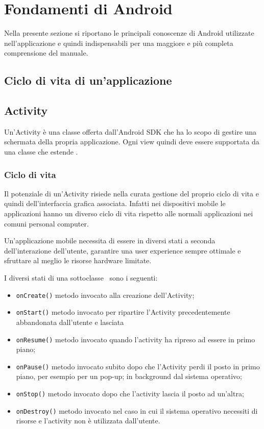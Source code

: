 \documentclass[../ManualeSviluppatore.tex]{subfiles}
\begin{document}
\begin{appendices}
	\label{sec:FondamentiDiAndroid}
	\section{Fondamenti di Android}
		Nella presente sezione si riportano le principali conoscenze di Android utilizzate nell'applicazione e quindi indispensabili per una maggiore e più completa comprensione del manuale.
	
		\subsection{Ciclo di vita di un'applicazione}
			
		
		\subsection{Activity}
			Un'Activity è una classe offerta dall'Android SDK che ha lo scopo di gestire una schermata della propria applicazione. Ogni view quindi deve essere supportata da una classe che estende \Activity.
		
			\subsubsection{Ciclo di vita}
				Il potenziale di un'Activity risiede nella curata gestione del proprio ciclo di vita e quindi dell'interfaccia grafica associata. Infatti nei dispositivi mobile le applicazioni hanno un diverso ciclo di vita rispetto alle normali applicazioni nei comuni personal computer.
				
				Un'applicazione mobile necessita di essere in diversi stati a seconda dell'interazione dell'utente, garantire una user experience sempre ottimale e sfruttare al meglio le risorse hardware limitate.
				
				I diversi stati di una sottoclasse \Activity\ sono i seguenti:
				\begin{itemize}
					\item \lstinline|onCreate()| metodo invocato alla creazione dell'Activity;
					\item \lstinline|onStart()| metodo invocato per ripartire l'Activity precedentemente abbandonata dall'utente e lasciata
					\item \lstinline|onResume()| metodo invocato quando l'activity ha ripreso ad essere in primo piano;
					\item \lstinline|onPause()| metodo invocato subito dopo che l'Activity perdi il posto in primo piano, per esempio per un pop-up;
					 in background dal sistema operativo;
					\item \lstinline|onStop()| metodo invocato dopo che l'activity lascia il posto ad un'altra;
					\item \lstinline|onDestroy()| metodo invocato nel caso in cui il sistema operativo necessiti di risorse e l'activity non è utilizzata dall'utente.
				\end{itemize}
				

\end{appendices}
\end{document}
